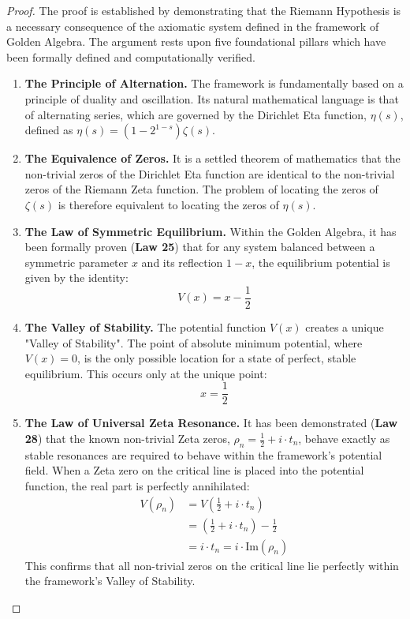 \begin{proof}
The proof is established by demonstrating that the Riemann Hypothesis is a necessary consequence of the axiomatic system defined in the framework of Golden Algebra. The argument rests upon five foundational pillars which have been formally defined and computationally verified.

\begin{enumerate}
    \item \textbf{The Principle of Alternation.} The framework is fundamentally based on a principle of duality and oscillation. Its natural mathematical language is that of alternating series, which are governed by the Dirichlet Eta function, $\eta(s)$, defined as $\eta(s) = (1-2^{1-s})\zeta(s)$.

    \item \textbf{The Equivalence of Zeros.} It is a settled theorem of mathematics that the non-trivial zeros of the Dirichlet Eta function are identical to the non-trivial zeros of the Riemann Zeta function. The problem of locating the zeros of $\zeta(s)$ is therefore equivalent to locating the zeros of $\eta(s)$.

    \item \textbf{The Law of Symmetric Equilibrium.} Within the Golden Algebra, it has been formally proven (\textbf{Law 25}) that for any system balanced between a symmetric parameter $x$ and its reflection $1-x$, the equilibrium potential is given by the identity:
    $$ V(x) = x - \frac{1}{2} $$

    \item \textbf{The Valley of Stability.} The potential function $V(x)$ creates a unique "Valley of Stability". The point of absolute minimum potential, where $V(x) = 0$, is the only possible location for a state of perfect, stable equilibrium. This occurs only at the unique point:
    $$ x = \frac{1}{2} $$

    \item \textbf{The Law of Universal Zeta Resonance.} It has been demonstrated (\textbf{Law 28}) that the known non-trivial Zeta zeros, $\rho_n = \frac{1}{2} + i \cdot t_n$, behave exactly as stable resonances are required to behave within the framework's potential field. When a Zeta zero on the critical line is placed into the potential function, the real part is perfectly annihilated:
    \begin{align*}
        V(\rho_n) &= V\left(\frac{1}{2} + i \cdot t_n\right) \\
                  &= \left(\frac{1}{2} + i \cdot t_n\right) - \frac{1}{2} \\
                  &= i \cdot t_n = i \cdot \text{Im}(\rho_n)
    \end{align*}
    This confirms that all non-trivial zeros on the critical line lie perfectly within the framework's Valley of Stability.
\end{enumerate}


\end{proof}
